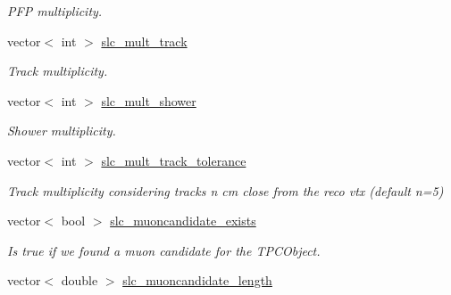 \begin{DoxyCompactItemize}
\begin{DoxyCompactList}\small\item\em P\-F\-P multiplicity. \end{DoxyCompactList}\item 
\hypertarget{classUBXSecEvent_a2fe1b939fcaf6ffbeb68c8879239c2c0}{vector$<$ int $>$ \hyperlink{classUBXSecEvent_a2fe1b939fcaf6ffbeb68c8879239c2c0}{slc\-\_\-mult\-\_\-track}}\label{classUBXSecEvent_a2fe1b939fcaf6ffbeb68c8879239c2c0}

\begin{DoxyCompactList}\small\item\em Track multiplicity. \end{DoxyCompactList}\item 
\hypertarget{classUBXSecEvent_aaf02413b3f000c45ecaf8aafa9d4e9be}{vector$<$ int $>$ \hyperlink{classUBXSecEvent_aaf02413b3f000c45ecaf8aafa9d4e9be}{slc\-\_\-mult\-\_\-shower}}\label{classUBXSecEvent_aaf02413b3f000c45ecaf8aafa9d4e9be}

\begin{DoxyCompactList}\small\item\em Shower multiplicity. \end{DoxyCompactList}\item 
\hypertarget{classUBXSecEvent_ab49b7199fe07b6ed85017048b685d7bb}{vector$<$ int $>$ \hyperlink{classUBXSecEvent_ab49b7199fe07b6ed85017048b685d7bb}{slc\-\_\-mult\-\_\-track\-\_\-tolerance}}\label{classUBXSecEvent_ab49b7199fe07b6ed85017048b685d7bb}

\begin{DoxyCompactList}\small\item\em Track multiplicity considering tracks n cm close from the reco vtx (default n=5) \end{DoxyCompactList}\item 
\hypertarget{classUBXSecEvent_a77d7addc1e52f51c7697daab275c8bc6}{vector$<$ bool $>$ \hyperlink{classUBXSecEvent_a77d7addc1e52f51c7697daab275c8bc6}{slc\-\_\-muoncandidate\-\_\-exists}}\label{classUBXSecEvent_a77d7addc1e52f51c7697daab275c8bc6}

\begin{DoxyCompactList}\small\item\em Is true if we found a muon candidate for the T\-P\-C\-Object. \end{DoxyCompactList}\item 
\hypertarget{classUBXSecEvent_aed08b3fea158e50f1f878bb211e7abb6}{vector$<$ double $>$ \hyperlink{classUBXSecEvent_aed08b3fea158e50f1f878bb211e7abb6}{slc\-\_\-muoncandidate\-\_\-length}}\label{classUBXSecEvent_aed08b3fea158e50f1f878bb211e7abb6}


\end{DoxyCompactItemize}
